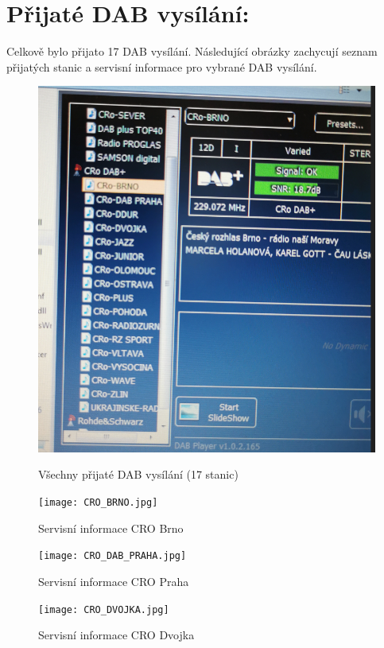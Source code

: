 \documentclass[10pt, a4paper]{article}%
\begin{document}
\section{\Large Přijaté DAB vysílání:}
Celkově bylo přijato 17 DAB vysílání. Následující obrázky zachycují seznam přijatých stanic a servisní informace
pro vybrané DAB vysílání.
\begin{figure}[ht!]
    \begin{minipage}{0.5\textwidth}
        \centering
        \includegraphics[height = 0.2\textheight]{all_radios.png}
        \caption{Všechny přijaté DAB vysílání (17 stanic)}
    \end{minipage}
    \begin{minipage}{0.5\textwidth}
        \centering
        \texttt{[image: CRO\_BRNO.jpg]}
        \caption{Servisní informace CRO Brno}
    \end{minipage}
    \begin{minipage}{0.5\textwidth}
        \centering
        \texttt{[image: CRO\_DAB\_PRAHA.jpg]}
        \caption{Servisní informace CRO Praha}
    \end{minipage}
    \begin{minipage}{0.5\textwidth}
        \centering
        \texttt{[image: CRO\_DVOJKA.jpg]}
        \caption{Servisní informace CRO Dvojka}
    \end{minipage}
    
\end{figure}




\end{document}
